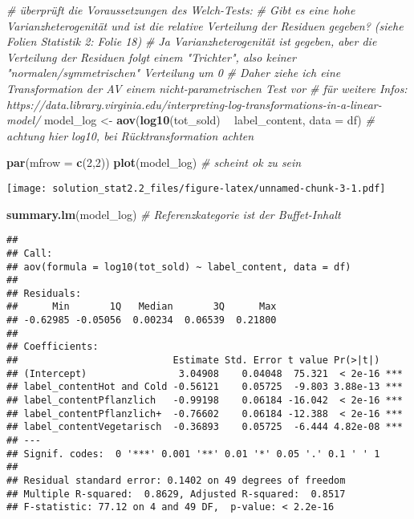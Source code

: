 \documentclass[]{article}
\newenvironment{Shaded}{\begin{snugshade}}{\end{snugshade}}
\newcommand{\CommentTok}[1]{\textcolor[rgb]{0.56,0.35,0.01}{\textit{#1}}}
\newcommand{\DataTypeTok}[1]{\textcolor[rgb]{0.13,0.29,0.53}{#1}}
\newcommand{\DecValTok}[1]{\textcolor[rgb]{0.00,0.00,0.81}{#1}}
\newcommand{\KeywordTok}[1]{\textcolor[rgb]{0.13,0.29,0.53}{\textbf{#1}}}
\newcommand{\NormalTok}[1]{#1}
\newcommand{\OperatorTok}[1]{\textcolor[rgb]{0.81,0.36,0.00}{\textbf{#1}}}
\newcommand{\StringTok}[1]{\textcolor[rgb]{0.31,0.60,0.02}{#1}}
\begin{document}
\begin{Shaded}
\begin{Highlighting}[]
\CommentTok{# überprüft die Voraussetzungen des Welch-Tests:}
\CommentTok{# Gibt es eine hohe Varianzheterogenität und ist die relative Verteilung der Residuen gegeben? (siehe Folien Statistik 2: Folie 18)}
\CommentTok{# Ja Varianzheterogenität ist gegeben, aber die Verteilung der Residuen folgt einem "Trichter", also keiner "normalen/symmetrischen" Verteilung um 0}
\CommentTok{# Daher ziehe ich eine Transformation der AV einem nicht-parametrischen Test vor}
\CommentTok{# für weitere Infos: https://data.library.virginia.edu/interpreting-log-transformations-in-a-linear-model/}
\NormalTok{model_log <-}\StringTok{ }\KeywordTok{aov}\NormalTok{(}\KeywordTok{log10}\NormalTok{(tot_sold) }\OperatorTok{~}\StringTok{ }\NormalTok{label_content, }\DataTypeTok{data =}\NormalTok{ df) }\CommentTok{# achtung hier log10, bei Rücktransformation achten}

\KeywordTok{par}\NormalTok{(}\DataTypeTok{mfrow =} \KeywordTok{c}\NormalTok{(}\DecValTok{2}\NormalTok{,}\DecValTok{2}\NormalTok{))}
\KeywordTok{plot}\NormalTok{(model_log) }\CommentTok{# scheint ok zu sein}
\end{Highlighting}
\end{Shaded}

\texttt{[image: solution\_stat2.2\_files/figure-latex/unnamed-chunk-3-1.pdf]}

\begin{Shaded}
\begin{Highlighting}[]
\KeywordTok{summary.lm}\NormalTok{(model_log) }\CommentTok{# Referenzkategorie ist der Buffet-Inhalt}
\end{Highlighting}
\end{Shaded}

\begin{verbatim}
## 
## Call:
## aov(formula = log10(tot_sold) ~ label_content, data = df)
## 
## Residuals:
##      Min       1Q   Median       3Q      Max 
## -0.62985 -0.05056  0.00234  0.06539  0.21800 
## 
## Coefficients:
##                           Estimate Std. Error t value Pr(>|t|)    
## (Intercept)                3.04908    0.04048  75.321  < 2e-16 ***
## label_contentHot and Cold -0.56121    0.05725  -9.803 3.88e-13 ***
## label_contentPflanzlich   -0.99198    0.06184 -16.042  < 2e-16 ***
## label_contentPflanzlich+  -0.76602    0.06184 -12.388  < 2e-16 ***
## label_contentVegetarisch  -0.36893    0.05725  -6.444 4.82e-08 ***
## ---
## Signif. codes:  0 '***' 0.001 '**' 0.01 '*' 0.05 '.' 0.1 ' ' 1
## 
## Residual standard error: 0.1402 on 49 degrees of freedom
## Multiple R-squared:  0.8629, Adjusted R-squared:  0.8517 
## F-statistic: 77.12 on 4 and 49 DF,  p-value: < 2.2e-16
\end{verbatim}
\end{document}
